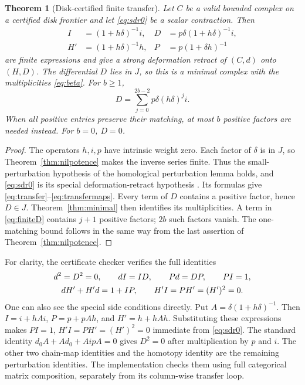 \documentclass[11pt]{article}
\newtheorem{theorem}{Theorem}[section]
\theoremstyle{definition}\newtheorem{definition}[theorem]{Definition}
\theoremstyle{remark}\newtheorem{remark}[theorem]{Remark}
\begin{document}
\begin{theorem}[Disk-certified finite transfer]\label{thm:transfer}
Let $C$ be a valid bounded complex on a certified disk frontier and let
\eqref{eq:sdr0} be a scalar contraction. Then
\begin{align}
 I&=(1+h\delta)^{-1}i,&
 D&=p\delta(1+h\delta)^{-1}i,\label{eq:transfer}\\
 H'&=(1+h\delta)^{-1}h,&
 P&=p(1+\delta h)^{-1}\label{eq:transfermaps}
\end{align}
are finite expressions and give a strong deformation retract of $(C,d)$ onto
$(H,D)$. The differential $D$ lies in $J$, so this is a minimal complex with the
multiplicities \eqref{eq:beta}. For $b\ge1$,
\begin{equation}\label{eq:finiteD}
 D=\sum_{j=0}^{2b-2}p\delta(h\delta)^ji.
\end{equation}
When all positive entries preserve their matching, at most $b$ positive factors
are needed instead. For $b=0$, $D=0$.
\end{theorem}
\begin{proof}
The operators $h,i,p$ have intrinsic weight zero. Each factor of $\delta$ is in
$J$, so Theorem~\ref{thm:nilpotence} makes the inverse series finite. Thus the
small-perturbation hypothesis of the homological perturbation lemma holds, and
\eqref{eq:sdr0} is its special deformation-retract hypothesis
\cite{Crainic2004}. Its formulas give \eqref{eq:transfer}--\eqref{eq:transfermaps}.
Every term of $D$ contains a positive factor, hence $D\in J$. Theorem~\ref{thm:minimal}
then identifies its multiplicities. A term in \eqref{eq:finiteD} contains $j+1$
positive factors; $2b$ such factors vanish. The one-matching bound follows in
the same way from the last assertion of Theorem~\ref{thm:nilpotence}.
\end{proof}

For clarity, the certificate checker verifies the full identities
\begin{gather}\label{eq:allchecks}
 d^2=D^2=0,\qquad dI=ID,\qquad Pd=DP,\qquad PI=1,\\
 dH'+H'd=1+IP,\qquad H'I=PH'=(H')^2=0.\notag
\end{gather}
One can also see the special side conditions directly. Put
$A=\delta(1+h\delta)^{-1}$. Then
$I=i+hAi$, $P=p+pAh$, and $H'=h+hAh$. Substituting these expressions makes
$PI=1$, $H'I=PH'=(H')^2=0$ immediate from \eqref{eq:sdr0}. The standard identity
$d_0A+Ad_0+AipA=0$ gives $D^2=0$ after multiplication by $p$ and $i$.
The other two chain-map identities and the homotopy identity are the remaining
perturbation identities. The implementation checks them using full categorical
matrix composition, separately from its column-wise transfer loop.
\end{document}
